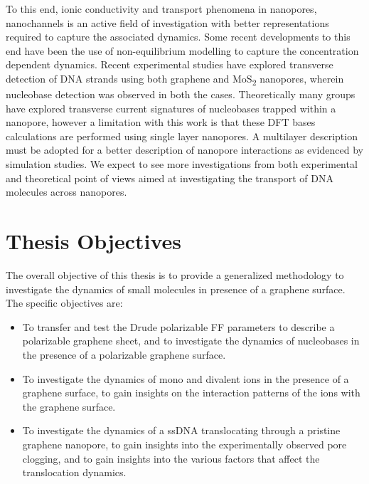To this end, ionic conductivity and transport phenomena in nanopores, nanochannels is an active field of investigation with better representations required to capture the associated dynamics. Some recent developments to this end have been the use of non-equilibrium modelling to capture the concentration dependent dynamics.\supercite{nazari_transport_2020,karmakar_non-equilibrium_2023} Recent experimental studies have explored transverse detection of DNA strands using both graphene\supercite{heerema_probing_2018} and MoS\textsubscript{2} nanopores,\supercite{graf_transverse_2019} wherein nucleobase detection was observed in both the cases. Theoretically many groups have explored transverse current signatures of nucleobases trapped within a nanopore, however a limitation with this work is that these DFT bases calculations are performed using single layer nanopores.\supercite{prasongkit_transverse_2011,lagerqvist_fast_2006,prasongkit_theoretical_2015} A multilayer description must be adopted for a better description of nanopore interactions as evidenced by simulation studies.\supercite{wells_assessing_2012} We expect to see more investigations from both experimental and theoretical point of views aimed at investigating the transport of DNA molecules across nanopores.

\section{Thesis Objectives}
The overall objective of this thesis is to provide a generalized methodology to investigate the dynamics of small molecules in presence of a graphene surface. The specific objectives are:
\begin{itemize}
    \item To transfer and test the Drude polarizable FF parameters to describe a polarizable graphene sheet, and to investigate the dynamics of nucleobases in the presence of a polarizable graphene surface.
    \item To investigate the dynamics of mono and divalent ions in the presence of a graphene surface, to gain insights on the interaction patterns of the ions with the graphene surface.
    \item To investigate the dynamics of a ssDNA translocating through a pristine graphene nanopore, to gain insights into the experimentally observed pore clogging, and to gain insights into the various factors that affect the translocation dynamics. 
\end{itemize}

